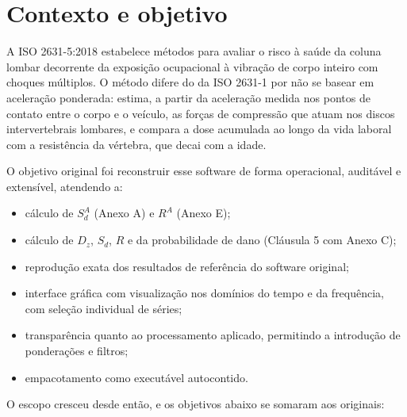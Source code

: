 \documentclass[11pt,a4paper]{article}
\begin{document}
\tableofcontents
\newpage

\section{Contexto e objetivo}

A ISO 2631-5:2018 estabelece métodos para avaliar o risco à saúde da coluna
lombar decorrente da exposição ocupacional à vibração de corpo inteiro com
choques múltiplos. O método difere do da ISO 2631-1 por não se basear em
aceleração ponderada: estima, a partir da aceleração medida nos pontos de
contato entre o corpo e o veículo, as forças de compressão que atuam nos discos
intervertebrais lombares, e compara a dose acumulada ao longo da vida laboral
com a resistência da vértebra, que decai com a idade.

O objetivo original foi reconstruir esse software de forma operacional,
auditável e extensível, atendendo a:

\begin{itemize}
  \item cálculo de $S_d^A$ (Anexo A) e $R^A$ (Anexo E);
  \item cálculo de $D_z$, $S_d$, $R$ e da probabilidade de dano (Cláusula 5 com
        Anexo C);
  \item reprodução exata dos resultados de referência do software original;
  \item interface gráfica com visualização nos domínios do tempo e da
        frequência, com seleção individual de séries;
  \item transparência quanto ao processamento aplicado, permitindo a
        introdução de ponderações e filtros;
  \item empacotamento como executável autocontido.
\end{itemize}

O escopo cresceu desde então, e os objetivos abaixo se somaram aos originais:
\end{document}
